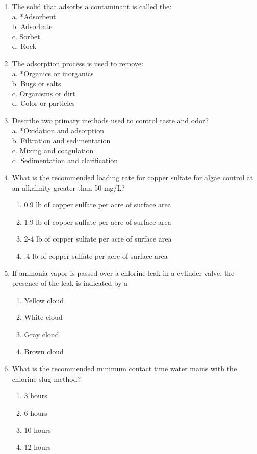 \begin{enumerate}
\item The solid that adsorbs a contaminant is called the:\\
a.  *Adsorbent\\
b.  Adsorbate\\
c.  Sorbet\\
d.  Rock\\

\item The adsorption process is used to remove:\\
a.  *Organics or inorganics\\
b.  Bugs or salts\\
c.  Organisms or dirt\\
d.  Color or particles\\

\item Describe two primary methods used to control taste and odor?\\
a.  *Oxidation and adsorption\\
b.  Filtration and sedimentation\\
c.  Mixing and coagulation\\
d.  Sedimentation and clarification\\

\item What is the recommended loading rate for copper sulfate for algae control at an alkalinity greater than 50 mg/L?
\begin{enumerate}
\item 0.9 lb of copper sulfate per acre of surface area
\item 1.9 lb of copper sulfate per acre of surface area
\item 2-4 lb of copper sulfate per acre of surface area
\item.4 lb of copper sulfate per acre of surface area
\end{enumerate}

\item If ammonia vapor is passed over a chlorine leak in a cylinder valve, the presence of the leak is indicated by a
\begin{enumerate}
\item Yellow cloud
\item White cloud
\item Gray cloud
\item Brown cloud
\end{enumerate}

\item What is the recommended minimum contact time water mains with the chlorine slug method?
\begin{enumerate}
\item 3 hours
\item 6 hours
\item 10 hours
\item 12 hours
\end{enumerate}


\end{enumerate}
